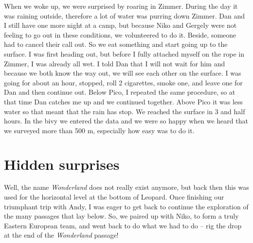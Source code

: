 When we woke up, we were surprised by roaring in Zimmer. During the day
it was raining outside, therefore a lot of water was purring down
Zimmer. Dan and I still have one more night at a camp, but because Niko
and Gergely were not feeling to go out in these conditions, we
volunteered to do it. Beside, someone had to cancel their call out. So
we eat something and start going up to the surface. I was first heading
out, but before I fully attached myself on the rope in Zimmer, I was
already all wet. I told Dan that I will not wait for him and because we
both know the way out, we will see each other on the surface. I was
going for about an hour, stopped, roll 2 cigarettes, smoke one, and
leave one for Dan and then continue out. Below Pico, I repeated the same
procedure, so at that time Dan catches me up and we continued together.
Above Pico it was less water so that meant that the rain has stop. We
reached the surface in 3 and half hours. In the bivy we entered the data
and we were so happy when we heard that we surveyed more than 500 m,
especially how easy was to do it.

\attrib{\izi}

\hypertarget{hidden-surprises}{%
\section{Hidden surprises}\label{hidden-surprises}}

Well, the name \emph{Wonderland} does not really exist anymore, but back
then this was used for the horizontal level at the bottom of Leopard.
Once finishing our triumphant trip with Andy, I was eager to get back to
continue the exploration of the many passages that lay below. So, we
paired up with Niko, to form a truly Eastern European team, and went
back to do what we had to do -- rig the drop at the end of the
\emph{Wonderland} passage!

